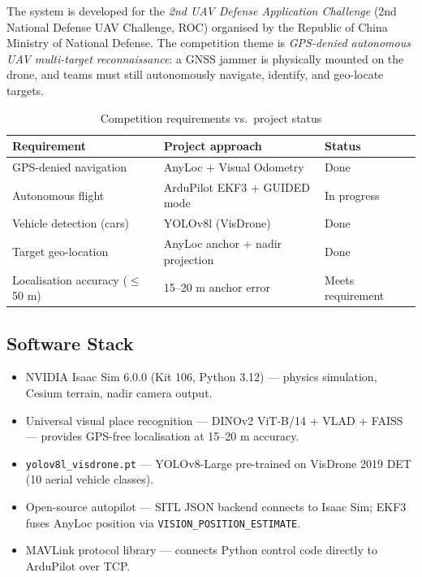 \documentclass[11pt,a4paper]{article}
\begin{document}
The system is developed for the \textit{2nd UAV Defense Application Challenge}
(2nd National Defense UAV Challenge, ROC) organised by the Republic of China Ministry of National Defense.
The competition theme is \textit{GPS-denied autonomous UAV multi-target reconnaissance}:
a GNSS jammer is physically mounted on the drone, and teams must still autonomously navigate,
identify, and geo-locate targets.

\begin{table}[h]
\centering
\caption{Competition requirements vs.\ project status}
\begin{tabular}{@{}lll@{}}
\toprule
\textbf{Requirement} & \textbf{Project approach} & \textbf{Status}\\
\midrule
GPS-denied navigation & AnyLoc + Visual Odometry & Done\\
Autonomous flight & ArduPilot EKF3 + GUIDED mode & In progress\\
Vehicle detection (cars) & YOLOv8l (VisDrone) & Done\\
Target geo-location & AnyLoc anchor + nadir projection & Done\\
Localisation accuracy ($\leq$50 m) & 15--20 m anchor error & Meets requirement\\
\bottomrule
\end{tabular}
\end{table}

\subsection*{Software Stack}

\begin{itemize}[leftmargin=1.6cm]
  \item[\textbf{Isaac Sim}] NVIDIA Isaac Sim 6.0.0 (Kit 106, Python 3.12) --- physics simulation, Cesium terrain, nadir camera output.
  \item[\textbf{AnyLoc}] Universal visual place recognition --- DINOv2 ViT-B/14 + VLAD + FAISS --- provides GPS-free localisation at 15--20 m accuracy.
  \item[\textbf{YOLOv8}] \texttt{yolov8l\_visdrone.pt} --- YOLOv8-Large pre-trained on VisDrone 2019 DET (10 aerial vehicle classes).
  \item[\textbf{ArduPilot}] Open-source autopilot --- SITL JSON backend connects to Isaac Sim; EKF3 fuses AnyLoc position via \texttt{VISION\_POSITION\_ESTIMATE}.
  \item[\textbf{pymavlink}] MAVLink protocol library --- connects Python control code directly to ArduPilot over TCP.
\end{itemize}
\end{document}
